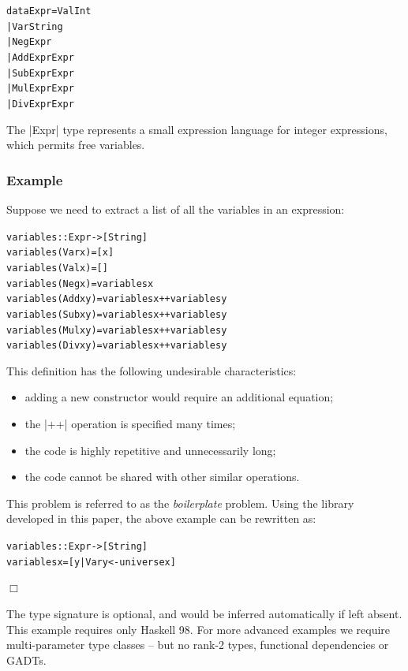 \documentclass[preprint]{sigplanconf}
\newcounter{exmp}
\newcommand{\yesexample}{\subsubsection*{Example \arabic{exmp}}\refstepcounter{exmp}}
\newcommand{\noexample}{\hfill$\Box$}
\newenvironment{code}{\begin{alltt}\small}{\end{alltt}}
\newenvironment{example}{\yesexample}{\noexample}
\begin{document}
\begin{code}
data Expr  =  Val  Int
           |  Var  String
           |  Neg  Expr
           |  Add  Expr  Expr
           |  Sub  Expr  Expr
           |  Mul  Expr  Expr
           |  Div  Expr  Expr
\end{code}

The |Expr| type represents a small expression language for integer expressions, which permits free variables.

\begin{example}
\label{ex:variables}

Suppose we need to extract a list of all the variables in an expression:

\begin{code}
variables :: Expr -> [String]
variables (Var  x    ) = [x]
variables (Val  x    ) = []
variables (Neg  x    ) = variables x
variables (Add  x y  ) = variables x ++ variables y
variables (Sub  x y  ) = variables x ++ variables y
variables (Mul  x y  ) = variables x ++ variables y
variables (Div  x y  ) = variables x ++ variables y
\end{code}

This definition has the following undesirable characteristics:

\begin{itemize}
\item adding a new constructor would require an additional equation;
\item the |++| operation is specified many times;
\item the code is highly repetitive and unnecessarily long;
\item the code cannot be shared with other similar operations.
\end{itemize}

This problem is referred to as the \textit{boilerplate} problem. Using the library developed in this paper, the above example can be rewritten as:

\begin{code}
variables :: Expr -> [String]
variables x = [y | Var y <- universe x]
\end{code}
\end{example}

The type signature is optional, and would be inferred automatically if left absent. This example requires only Haskell 98. For more advanced examples we require multi-parameter type classes -- but no rank-2 types, functional dependencies or GADTs.
\end{document}

